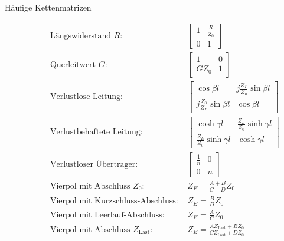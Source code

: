 \begin{description}
\item[Häufige Kettenmatrizen] 
\begin{align*}
\text{Längswiderstand $R$: }& \left[ \begin{matrix}
1 & \frac{R}{Z_0} \\ 
0 & 1
\end{matrix} \right] \\
\text{Querleitwert $G$: }& \left[ \begin{matrix}
1 & 0 \\ 
G Z_0 & 1
\end{matrix} \right] \\
\text{Verlustlose Leitung: }& \left[ \begin{matrix}
\cos \beta l & j\frac{Z_L}{Z_0} \sin \beta l \\ 
j\frac{Z_0}{Z_L} \sin \beta l & \cos \beta l
\end{matrix} \right] \\
\text{Verlustbehaftete Leitung: }& \left[ \begin{matrix}
\cosh \gamma l & \frac{Z_L}{Z_0} \sinh \gamma l \\ 
\frac{Z_L}{Z_0} \sinh \gamma l & \cosh \gamma l
\end{matrix} \right] \\
\text{Verlustloser Übertrager: }& \left[ \begin{matrix}
\frac{1}{n} & 0 \\ 
0 & n
\end{matrix} \right] \\
\text{Vierpol mit Abschluss $Z_0$: }& Z_E = \frac{A+B}{C+D} Z_0 \\
\text{Vierpol mit Kurzschluss-Abschluss: }& Z_E = \frac{B}{D} Z_0 \\
\text{Vierpol mit Leerlauf-Abschluss: }& Z_E = \frac{A}{C} Z_0 \\
\text{Vierpol mit Abschluss $Z_\text{Last}$: }& Z_E = \frac{A Z_\text{Last} + B Z_0}{C Z_\text{Last} + D Z_0} \\
\end{align*}
\end{description}